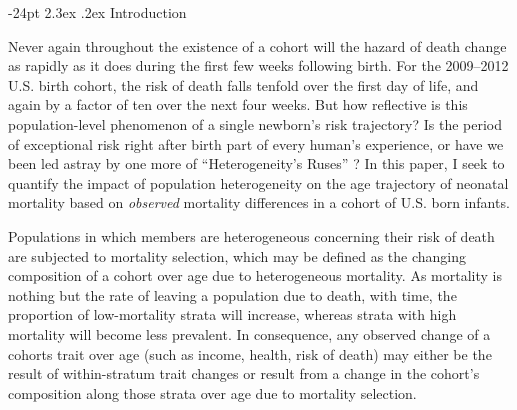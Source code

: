 \documentclass[10pt,twoside,reqno]{article}
\makeatletter
\newcounter{authorcount}
\renewcommand\section{\@startsection {section}{1}{\z@}%
                                   {-24pt}%
                                   {2.3ex \@plus.2ex}%
                                   {\normalfont\large\bfseries}}
\makeatother
\begin{document}
\setlength{\parskip}{0ex}


\setcounter{footnote}{\value{authorcount}}
\newpage
\pagestyle{regular}

\section{Introduction}\label{introduction}

Never again throughout the existence of a cohort will the hazard of death change as rapidly as it does during the first few weeks following birth. For the 2009--2012 U.S. birth cohort, the risk of death falls tenfold over the first day of life, and again by a factor of ten over the next four weeks. But how reflective is this population-level phenomenon of a single newborn's risk trajectory? Is the period of exceptional risk right after birth part of every human's experience, or have we been led astray by one more of ``Heterogeneity's Ruses'' \citep{Vaupel1985}? In this paper, I seek to quantify the impact of population heterogeneity on the age trajectory of neonatal mortality based on \emph{observed} mortality differences in a cohort of U.S. born infants.

Populations in which members are heterogeneous concerning their risk of death are subjected to mortality selection, which may be defined as the changing composition of a cohort over age due to heterogeneous mortality. As mortality is nothing but the rate of leaving a population due to death, with time, the proportion of low-mortality strata will increase, whereas strata with high mortality will become less prevalent. In consequence, any observed change of a cohorts trait over age (such as income, health, risk of death) may either be the result of within-stratum trait changes or result from a change in the cohort's composition along those strata over age due to mortality selection.
\end{document}
